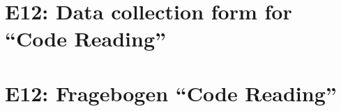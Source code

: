 
\thispagestyle{empty}
\ifenglish
\section*{E12: Data collection form for ``Code Reading''}

\fi
\ifgerman
\section*{E12: Fragebogen "`Code Reading"'}

\fi

